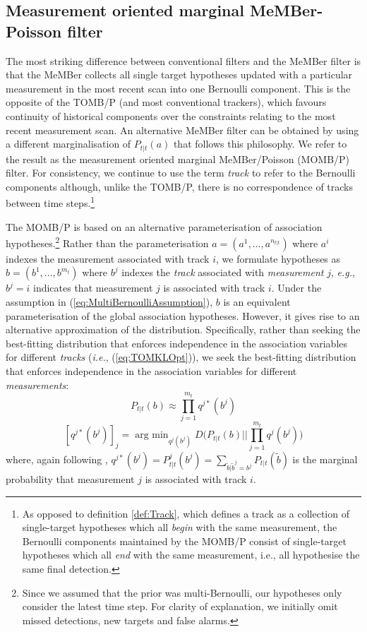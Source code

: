 \documentclass[journal,twoside]{IEEEtran}
\theoremstyle{plain}
\DeclareMathOperator*{\argmin}{arg~min}
\begin{document}
\subsection{Measurement oriented marginal MeMBer-Poisson filter}
\label{ss:MOMB}
%
{\noindent}The most striking difference between conventional filters and the MeMBer filter \cite{Mah07,VoVo09} is that the MeMBer collects all single target hypotheses updated with a particular measurement in the most recent scan into one Bernoulli component. This is the opposite of the TOMB/P (and most conventional trackers), which favours continuity of historical components over the constraints relating to the most recent measurement scan. An alternative MeMBer filter can be obtained by using a different marginalisation of $P_{t|t}(a)$ that follows this philosophy. We refer to the result as the measurement oriented marginal MeMBer/Poisson (MOMB/P) filter. For consistency, we continue to use the term \emph{track} to refer to the Bernoulli components although, unlike the TOMB/P, there is no correspondence of tracks between time steps.\footnote{As opposed to definition \ref{def:Track}, which defines a track as a collection of single-target hypotheses which all \emph{begin} with the same measurement, the Bernoulli components maintained by the MOMB/P consist of single-target hypotheses which all \emph{end} with the same measurement, i.e., all hypothesise the same final detection.}

The MOMB/P is based on an alternative parameterisation of association hypotheses.\footnote{Since we assumed that the prior was multi-Bernoulli, our hypotheses only consider the latest time step. For clarity of explanation, we initially omit missed detections, new targets and false alarms.} Rather than the parameterisation $a=(a^1,\dots,a^{n_{t|t}})$ where $a^i$ indexes the measurement associated with track $i$, we formulate hypotheses as $b=(b^1,\dots,b^{m_t})$ where $b^j$ indexes the \emph{track} associated with \emph{measurement} $j$, \textit{e.g.}\xspace, $b^j=i$ indicates that measurement $j$ is associated with track $i$. Under the assumption in (\ref{eq:MultiBernoulliAssumption}), $b$ is an equivalent parameterisation of the global association hypotheses. However, it gives rise to an alternative approximation of the distribution. Specifically, rather than seeking the best-fitting distribution that enforces independence in the association variables for different \emph{tracks} (\textit{i.e.}\xspace, (\ref{eq:TOMKLOpt})), we seek the best-fitting distribution that enforces independence in the association variables for different \emph{measurements}:
%
\[
P_{t|t}(b) \approx \prod_{j=1}^{m_t}q^{j*}(b^j)
\]
\begin{equation}\label{eq:MOMKLOpt}
\left[q^{j*}(b^j)\right]_j = \argmin_{q^j(b^j)}D\bigg(P_{t|t}(b)\bigg|\bigg|\prod_{j=1}^{m_t} q^j(b^j) \bigg)
\end{equation}
%
where, again following \cite[p277]{KolFri09}, $q^{j*}(b^j) =  P_{t|t}^j(b^j) = \sum_{\tilde{b}|\tilde{b}^j=b^j}P_{t|t}(\tilde{b})$ is the marginal probability that measurement $j$ is associated with track $i$.
\end{document}
